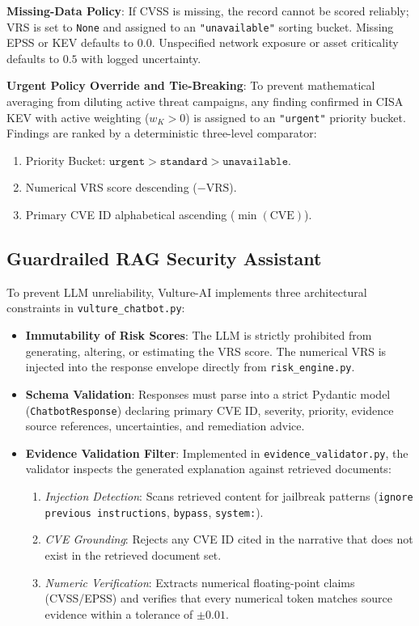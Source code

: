 \documentclass[conference]{IEEEtran}
\begin{document}
\textbf{Missing-Data Policy}: If CVSS is missing, the record cannot be scored reliably; VRS is set to \texttt{None} and assigned to an \texttt{"unavailable"} sorting bucket. Missing EPSS or KEV defaults to $0.0$. Unspecified network exposure or asset criticality defaults to $0.5$ with logged uncertainty.

\textbf{Urgent Policy Override and Tie-Breaking}:
To prevent mathematical averaging from diluting active threat campaigns, any finding confirmed in CISA KEV with active weighting ($w_K > 0$) is assigned to an \texttt{"urgent"} priority bucket. Findings are ranked by a deterministic three-level comparator:
\begin{enumerate}
    \item Priority Bucket: $\texttt{urgent} > \texttt{standard} > \texttt{unavailable}$.
    \item Numerical VRS score descending ($-\text{VRS}$).
    \item Primary CVE ID alphabetical ascending ($\min(\text{CVE})$).
\end{enumerate}

\subsection{Guardrailed RAG Security Assistant}
To prevent LLM unreliability, Vulture-AI implements three architectural constraints in \texttt{vulture\_chatbot.py}:
\begin{itemize}
    \item \textbf{Immutability of Risk Scores}: The LLM is strictly prohibited from generating, altering, or estimating the VRS score. The numerical VRS is injected into the response envelope directly from \texttt{risk\_engine.py}.
    \item \textbf{Schema Validation}: Responses must parse into a strict Pydantic model (\texttt{ChatbotResponse}) declaring primary CVE ID, severity, priority, evidence source references, uncertainties, and remediation advice.
    \item \textbf{Evidence Validation Filter}: Implemented in \texttt{evidence\_validator.py}, the validator inspects the generated explanation against retrieved documents:
    \begin{enumerate}
        \item \textit{Injection Detection}: Scans retrieved content for jailbreak patterns (\texttt{ignore previous instructions}, \texttt{bypass}, \texttt{system:}).
        \item \textit{CVE Grounding}: Rejects any CVE ID cited in the narrative that does not exist in the retrieved document set.
        \item \textit{Numeric Verification}: Extracts numerical floating-point claims (CVSS/EPSS) and verifies that every numerical token matches source evidence within a tolerance of $\pm 0.01$.
    \end{enumerate}
\end{itemize}
\end{document}
